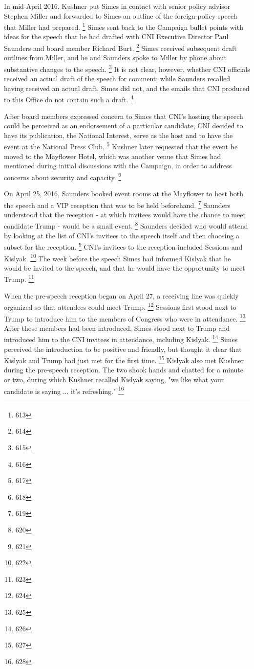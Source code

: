 In mid-April 2016, Kushner put Simes in contact with senior policy advisor Stephen Miller and forwarded to Simes an outline of the foreign-policy speech that Miller had prepared.%
\footnote{613}
Simes sent back to the Campaign bullet points with ideas for the speech that he had drafted with CNI Executive Director Paul Saunders and board member Richard Burt.%
\footnote{614}
Simes received subsequent draft outlines from Miller, and he and Saunders spoke to Miller by phone about substantive changes to the speech.%
\footnote{615}
It is not clear, however, whether CNI officials received an actual draft of the speech for comment; while Saunders recalled having received an actual draft, Simes did not, and the emails that CNI produced to this Office do not contain such a draft.%
\footnote{616}

After board members expressed concern to Simes that CNI's hosting the speech could be perceived as an endorsement of a particular candidate, CNI decided to have its publication, the National Interest, serve as the host and to have the event at the National Press Club.%
\footnote{617}
Kushner later requested that the event be moved to the Mayflower Hotel, which was another venue that Simes had mentioned during initial discussions with the Campaign, in order to address concerns about security and capacity.%
\footnote{618}

On April 25, 2016, Saunders booked event rooms at the Mayflower to host both the speech and a VIP reception that was to be held beforehand.%
\footnote{619}
Saunders understood that the reception - at which invitees would have the chance to meet candidate Trump - would be a small event.%
\footnote{620}
Saunders decided who would attend by looking at the list of CNI's invitees to the speech itself and then choosing a subset for the reception.%
\footnote{621}
CNI's invitees to the reception included Sessions and Kislyak.%
\footnote{622}
The week before the speech Simes had informed Kislyak that he would be invited to the speech, and that he would have the opportunity to meet Trump.%
\footnote{623}

When the pre-speech reception began on April 27, a receiving line was quickly organized so that attendees could meet Trump.%
\footnote{624}
Sessions first stood next to Trump to introduce him to the members of Congress who were in attendance.%
\footnote{625}
After those members had been introduced, Simes stood next to Trump and introduced him to the CNI invitees in attendance, including Kislyak.%
\footnote{626}
Simes perceived the introduction to be positive and friendly, but thought it clear that Kislyak and Trump had just met for the first time.%
\footnote{627}
Kislyak also met Kushner during the pre-speech reception.
The two shook hands and chatted for a minute or two, during which Kushner recalled Kislyak saying, "we like what your candidate is saying ... it's refreshing."%
\footnote{628}

